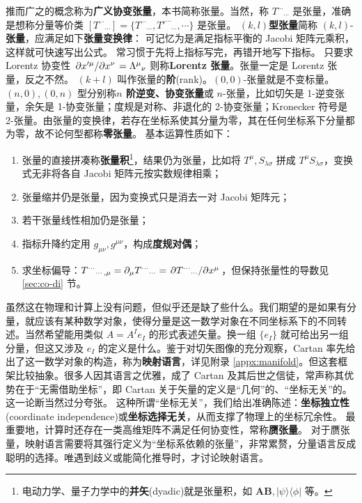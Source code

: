 推而广之的概念称为\textbf{广义协变张量}，本书简称张量。当然，称 $T^{\cdots}{}_{\cdots}$ 是张量，准确是想称分量等价类 $[T^{\cdots}{}_{\cdots}]=\{T^{\cdots}{}_{\cdots},T'^{\cdots}{}_{\cdots},\cdots\}$ 是张量。
$(k,l)$\textbf{型张量}简称 $(k,l)$-\textbf{张量}，应满足如下\textbf{张量变换律}：
可记忆为是满足指标平衡的 Jacobi 矩阵元乘积，这样就可快速写出公式。
常习惯于先将上指标写完，再错开地写下指标。
只要求 Lorentz 协变性 $\pdv*{x'^\mu}{x^\nu}=\Lambda^\mu{}_\nu$ 则称\textbf{Lorentz 张量}。张量一定是 Lorentz 张量，反之不然。
$(k+l)$ 叫作张量的\textbf{阶}(rank)。$(0,0)$-张量就是不变标量。$(n,0),(0,n)$ 型分别称\textbf{$n$ 阶逆变、协变张量}或 $n$-张量，比如切矢是 1-逆变张量，余矢是 1-协变张量；度规是对称、非退化的 2-协变张量；Kronecker 符号是 2-张量。由张量的变换律，若存在坐标系使其分量为零，其在任何坐标系下分量都为零，故不论何型都称\textbf{零张量}。
基本运算性质如下：
\begin{enumerate}
    \item 张量的直接拼凑称\textbf{张量积}\footnote{电动力学、量子力学中的\textbf{并矢}(dyadic)就是张量积，如 $\bm A\bm B,|\psi\rangle\langle\phi|$ 等。}，结果仍为张量，比如将 $T^\mu,S_{\lambda\sigma}$ 拼成 $T^\mu S_{\lambda\sigma}$，变换式无非将各自 Jacobi 矩阵元按实数规律相乘；
    \item 张量缩并仍是张量，因为变换式只是消去一对 Jacobi 矩阵元；
    \item 若干张量线性相加仍是张量；\item 指标升降约定用 $g_{\mu\nu},g^{\mu\nu}$，构成\textbf{度规对偶}；
    \item 求坐标偏导：$T^{\cdots}{}_{\cdots,\mu}=\partial_\mu T^{\cdots}{}_{\cdots}=\pdv*{T^{\cdots}{}_{\cdots}}{x^\mu}$，但保持张量性的导数见 \ref{sec:co-di} 节。
\end{enumerate}

虽然这在物理和计算上没有问题，但似乎还是缺了些什么。我们期望的是如果有分量，就应该有某种数学对象，使得分量是这一数学对象在不同坐标系下的不同转述。当然希望能用类似 $A=A^I e_I$ 的形式表述矢量。换一组 $\{e_I\}$ 就可给出另一组分量，但这又涉及 $e_I$ 的定义是什么。鉴于对切矢图像的充分观察，Cartan 率先给出了这一数学对象的构造，称为\textbf{映射语言}，详见附录 \ref{appx:manifold}。但这套框架比较抽象。很多人因其语言之优雅，成了 Cartan 及其后世之信徒，常声称其优势在于“无需借助坐标”，即 Cartan 关于矢量的定义是“几何”的、“坐标无关”的。这一论断当然过分夸张。
这种所谓“坐标无关”，我们给出准确陈述：\textbf{坐标独立性}(coordinate independence)或\textbf{坐标选择无关}，从而支撑了物理上的坐标冗余性。
最重要地，计算时还存在一类高维矩阵不满足任何协变性，常称\textbf{赝张量}。
对于赝张量，映射语言需要将其强行定义为“坐标系依赖的张量”，非常累赘，分量语言反成聪明的选择。唯遇到歧义或能简化推导时，才讨论映射语言。


